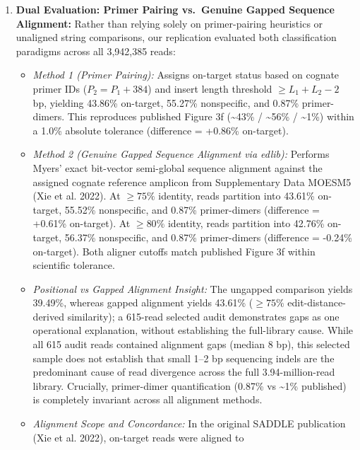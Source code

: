 \documentclass[
]{article}
\providecommand{\tightlist}{%
  \setlength{\itemsep}{0pt}\setlength{\parskip}{0pt}}
\begin{document}
\begin{enumerate}
\def\labelenumi{\arabic{enumi}.}
\tightlist
\item
  \textbf{Dual Evaluation: Primer Pairing vs.~Genuine Gapped Sequence
  Alignment:} Rather than relying solely on primer-pairing heuristics or
  unaligned string comparisons, our replication evaluated both
  classification paradigms across all 3,942,385 reads:

  \begin{itemize}
  \tightlist
  \item
    \emph{Method 1 (Primer Pairing):} Assigns on-target status based on
    cognate primer IDs (\(P_2 = P_1 + 384\)) and insert length threshold
    \(\ge L_1 + L_2 - 2\) bp, yielding 43.86\% on-target, 55.27\%
    nonspecific, and 0.87\% primer-dimers. This reproduces published
    Figure 3f (\textasciitilde43\% / \textasciitilde56\% /
    \textasciitilde1\%) within a 1.0\% absolute tolerance (difference =
    +0.86\% on-target).
  \item
    \emph{Method 2 (Genuine Gapped Sequence Alignment via edlib):}
    Performs Myers' exact bit-vector semi-global sequence alignment
    against the assigned cognate reference amplicon from Supplementary
    Data MOESM5 (Xie et al. 2022). At \(\ge 75\%\) identity, reads
    partition into 43.61\% on-target, 55.52\% nonspecific, and 0.87\%
    primer-dimers (difference = +0.61\% on-target). At \(\ge 80\%\)
    identity, reads partition into 42.76\% on-target, 56.37\%
    nonspecific, and 0.87\% primer-dimers (difference = -0.24\%
    on-target). Both aligner cutoffs match published Figure 3f within
    scientific tolerance.
  \item
    \emph{Positional vs Gapped Alignment Insight:} The ungapped
    comparison yields 39.49\%, whereas gapped alignment yields 43.61\%
    (\(\ge 75\%\) edit-distance-derived similarity); a 615-read selected
    audit demonstrates gaps as one operational explanation, without
    establishing the full-library cause. While all 615 audit reads
    contained alignment gaps (median 8 bp), this selected sample does
    not establish that small 1--2 bp sequencing indels are the
    predominant cause of read divergence across the full
    3.94-million-read library. Crucially, primer-dimer quantification
    (0.87\% vs \textasciitilde1\% published) is completely invariant
    across all alignment methods.
  \item
    \emph{Alignment Scope and Concordance:} In the original SADDLE
    publication (Xie et al. 2022), on-target reads were aligned to

\end{itemize}
\end{enumerate}
\end{document}
